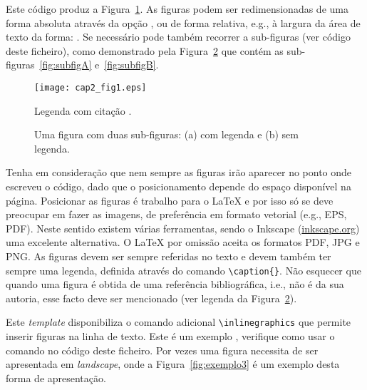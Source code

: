 Este código produz a Figura~\ref{fig:exemplo1}. As figuras podem ser redimensionadas de uma forma absoluta através da opção , ou de forma relativa, e.g., à largura da área de texto da forma: . Se necessário pode também recorrer a sub-figuras (ver código deste ficheiro), como demonstrado pela Figura~\ref{fig:exemplo2} que contém as sub-figuras~\ref{fig:subfigA} e~\ref{fig:subfigB}.

\begin{figure}[htbp]
	\centering
	\texttt{[image: cap2\_fig1.eps]}
	\caption{Legenda com citação \cite{Lipsum08}.}
	\label{fig:exemplo1}
\end{figure}

\begin{figure}[htbp]
  \centering
  \caption[Uma figura com duas sub-figuras.]{Uma figura com duas sub-figuras: (a) com legenda e (b) sem legenda.}
  \label{fig:exemplo2}
\end{figure}

Tenha em consideração que nem sempre as figuras irão aparecer no ponto onde escreveu o código, dado que o posicionamento depende do espaço disponível na página. Posicionar as figuras é trabalho para o \LaTeX{} e por isso só se deve preocupar em fazer as imagens, de preferência em formato vetorial (e.g., EPS, PDF). Neste sentido existem várias ferramentas, sendo o Inkscape (\url{inkscape.org}) uma excelente alternativa. O \LaTeX{} por omissão aceita os formatos PDF, JPG e PNG. As figuras devem ser sempre referidas no texto e devem também ter sempre uma legenda, definida através do comando \verb|\caption{}|. Não esquecer que quando uma figura é obtida de uma referência bibliográfica, i.e., não é da sua autoria, esse facto deve ser mencionado (ver legenda da Figura~\ref{fig:exemplo2}).

Este \textit{template} disponibiliza o comando adicional \verb|\inlinegraphics| que permite inserir figuras na linha de texto. Este é um exemplo , verifique como usar o comando no código deste ficheiro. Por vezes uma figura necessita de ser apresentada em \textit{landscape}, onde a Figura~\ref{fig:exemplo3} é um exemplo desta forma de apresentação.


